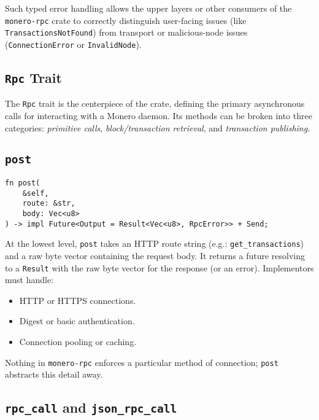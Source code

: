 \documentclass[12pt,a4paper]{article}
\begin{document}
Such typed error handling allows the upper layers or other consumers of the
\texttt{monero-rpc} crate to correctly distinguish user-facing issues (like
\texttt{TransactionsNotFound}) from transport or malicious-node issues
(\texttt{ConnectionError} or \texttt{InvalidNode}).

\subsection{\texttt{Rpc} Trait}
\label{sec:monero-rpc-rpc-trait}

The \texttt{Rpc} trait is the centerpiece of the crate, defining the primary
asynchronous calls for interacting with a Monero daemon.  Its methods can be
broken into three categories: \emph{primitive calls}, \emph{block/transaction
retrieval}, and \emph{transaction publishing}. %

\subsection{\texttt{post}}
\label{sec:monero-rpc-rpc-trait-post}

\begin{verbatim}
fn post(
    &self,
    route: &str,
    body: Vec<u8>
) -> impl Future<Output = Result<Vec<u8>, RpcError>> + Send;
\end{verbatim}

At the lowest level, \texttt{post} takes an HTTP route string (e.g.:
\texttt{get\_transactions}) and a raw byte vector containing the request body.
It returns a future resolving to a \texttt{Result} with the raw byte vector for
the response (or an error).  Implementors must handle:

\begin{itemize}
    \item HTTP or HTTPS connections.
    \item Digest or basic authentication.
    \item Connection pooling or caching.
\end{itemize}

Nothing in \texttt{monero-rpc} enforces a particular method of connection;
\texttt{post} abstracts this detail away.

\subsection{\texttt{rpc\_call} and \texttt{json\_rpc\_call}}
\label{sec:monero-rpc-rpc-trait-jsonrpc}
\end{document}
